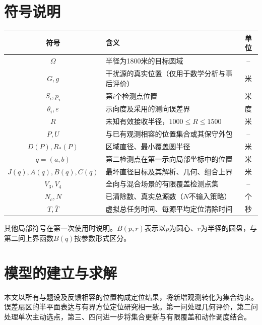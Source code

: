 \documentclass{JXUSTmodeling}
\begin{document}
\section{符号说明}\label{sec:4}
\begin{table}[H]
\centering
\begin{tabularx}{\textwidth}{cXc}
\toprule
符号 & 含义 & 单位\\
\midrule
$\Omega$ & 半径为1800米的目标圆域 & --\\
$G,g$ & 干扰源的真实位置（仅用于数学分析与事后评价） & 米\\
$S_i,p_i$ & 第$i$个检测点位置 & 米\\
$\theta_i,\varepsilon$ & 示向度及采用的测向误差界 & 度\\
$R$ & 未知有效接收半径，$1000\le R\le1500$ & 米\\
$P,U$ & 与已有观测相容的位置集合或其保守外包 & --\\
$D(P),R_*(P)$ & 区域直径、最小覆盖圆半径 & 米\\
$q=(a,b)$ & 第二检测点在第一示向局部坐标中的位置 & 米\\
$J(q),A(q),B(q),C(q)$ & 最坏直径目标及其解析、几何、组合上界 & 米\\
$V_3,V_4$ & 全向与混合场景的有限覆盖检测点集 & --\\
$N_c,N$ & 已清除数、真实总源数（$N$不输入策略） & 个\\
$T,\overline T$ & 虚拟总任务时间、每源平均定位清除时间 & 秒\\
\bottomrule
\end{tabularx}
\end{table}
其他局部符号在第一次使用时说明。$B(p,r)$表示以$p$为圆心、$r$为半径的圆盘，与第二问上界函数$B(q)$按参数形式区分。

\section{模型的建立与求解}\label{sec:5}
本文以所有与题设及反馈相容的位置构成定位结果，将新增观测转化为集合约束。误差扇区的半平面表达与有界方位定位研究相一致\cite{gholami2015}。第一问处理几何评价，第二问处理单次主动选点，第三、四问进一步将集合更新与有限覆盖和动作调度结合。
\end{document}
